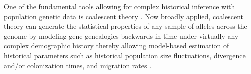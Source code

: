 \documentclass[12pt]{article}
\begin{document}







One of the fundamental tools allowing for complex historical inference
with population genetic data is coalescent theory \citep{Hudson1983-hx,
  Tajima1983-me, Kingman1982-uf, Kingman1982-ie, Rosenberg2002-ag}.
Now broadly applied, coalescent theory can generate the statistical
properties of any sample of alleles across the genome by modeling gene
genealogies backwards in time under virtually any complex demographic
history thereby allowing model-based estimation of historical
parameters such as historical population size fluctuations, divergence
and/or colonization times, and migration rates \citep{Wakeley2008-se}.
\end{document}
